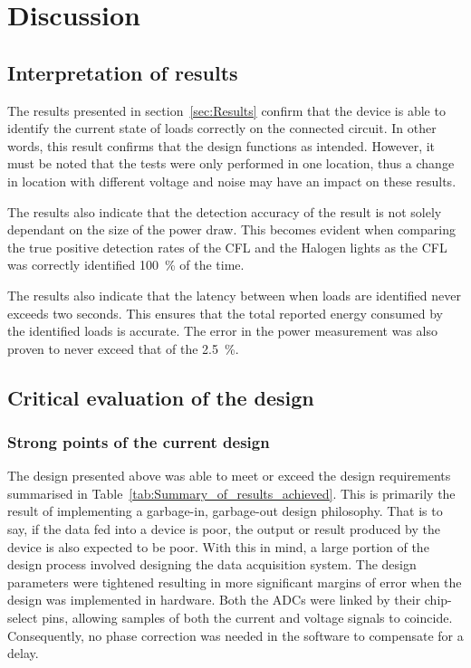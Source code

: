 
\section{Discussion}

\subsection{Interpretation of results}

The results presented in section~\ref{sec:Results} confirm that the device is able to identify the current state of loads correctly on the connected circuit. In other words, this result confirms that the design functions as intended. However, it must be noted that the tests were only performed in one location, thus a change in location with different voltage and noise may have an impact on these results.
\par
The results also indicate that the detection accuracy of the result is not solely dependant on the size of the power draw. This becomes evident when comparing the true positive detection rates of the CFL and the Halogen lights as the CFL was correctly identified \qty{100}{\percent} of the time.
\par
The results also indicate that the latency between when loads are identified never exceeds two seconds. This ensures that the total reported energy consumed by the identified loads is accurate. The error in the power measurement was also proven to never exceed that of the \qty{2.5}{\percent}.
\subsection{Critical evaluation of the design}

\subsubsection{Strong points of the current design}
The design presented above was able to meet or exceed the design requirements summarised in Table~\ref{tab:Summary_of_results_achieved}. This is primarily the result of implementing a garbage-in, garbage-out design philosophy. That is to say, if the data fed into a device is poor, the output or result produced by the device is also expected to be poor. With this in mind, a large portion of the design process involved designing the data acquisition system. The design parameters were tightened resulting in more significant margins of error when the design was implemented in hardware. Both the ADCs were linked by their chip-select pins, allowing samples of both the current and voltage signals to coincide. Consequently, no phase correction was needed in the software to compensate for a delay. 
